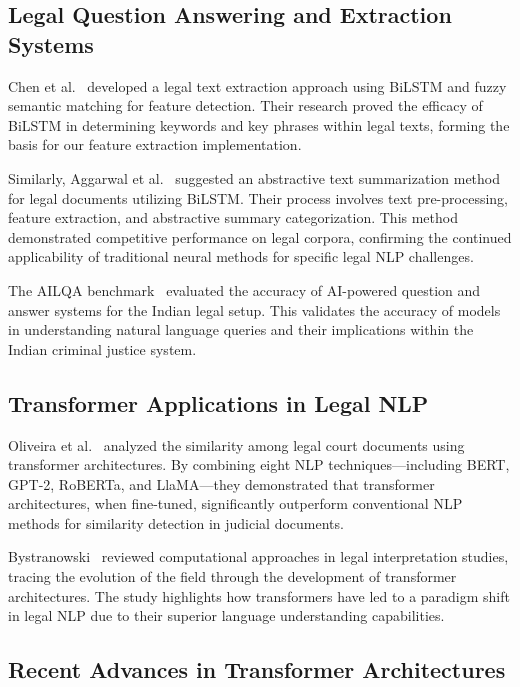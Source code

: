 \documentclass{llncs}
\begin{document}
\subsection{Legal Question Answering and Extraction Systems}

Chen et al.~\cite{chen2025bilstm} developed a legal text extraction approach using BiLSTM and fuzzy semantic matching for feature detection. Their research proved the efficacy of BiLSTM in determining keywords and key phrases within legal texts, forming the basis for our feature extraction implementation.

Similarly, Aggarwal et al.~\cite{aggarwal2025abstractive} suggested an abstractive text summarization method for legal documents utilizing BiLSTM. Their process involves text pre-processing, feature extraction, and abstractive summary categorization. This method demonstrated competitive performance on legal corpora, confirming the continued applicability of traditional neural methods for specific legal NLP challenges.

The AILQA benchmark~\cite{ailqa2024} evaluated the accuracy of AI-powered question and answer systems for the Indian legal setup. This validates the accuracy of models in understanding natural language queries and their implications within the Indian criminal justice system.

\subsection{Transformer Applications in Legal NLP}

Oliveira et al.~\cite{oliveira2025similarity} analyzed the similarity among legal court documents using transformer architectures. By combining eight NLP techniques—including BERT, GPT-2, RoBERTa, and LlaMA—they demonstrated that transformer architectures, when fine-tuned, significantly outperform conventional NLP methods for similarity detection in judicial documents.

Bystranowski~\cite{bystranowski2025computational} reviewed computational approaches in legal interpretation studies, tracing the evolution of the field through the development of transformer architectures. The study highlights how transformers have led to a paradigm shift in legal NLP due to their superior language understanding capabilities.

\subsection{Recent Advances in Transformer Architectures}
\end{document}
